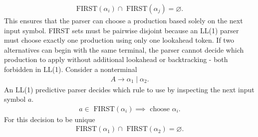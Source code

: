 \documentclass{report}
\begin{document}
\begin{itemize}
\begin{enumerate}
\begin{align*}
                        \text{FIRST}(\alpha_{i}) \cap \text{ FIRST}(\alpha_{j}) = \varnothing
                    .\end{align*}
                    This ensures that the parser can choose a production based solely on the next input symbol.
                    \bigbreak \noindent 
                    FIRST sets must be pairwise disjoint because an LL(1) parser must choose exactly one production using only one lookahead token. If two alternatives can begin with the same terminal, the parser cannot decide which production to apply without additional lookahead or backtracking - both forbidden in LL(1).
                    \bigbreak \noindent 
                    Consider a nonterminal 
                    \begin{align*}
                        A \to \alpha_{1} \mid \alpha_{2}
                    .\end{align*}
                    An LL(1) predictive parser decides which rule to use by inspecting the next input symbol $a$. 
                    \begin{align*}
                        a \in \text{ FIRST}(\alpha_{i}) \implies \text{ choose } \alpha_{i}
                    .\end{align*}
                    For this decision to be unique 
                    \begin{align*}
                        \text{FIRST}(\alpha_{1}) \cap \text{ FIRST}(\alpha_{2}) = \varnothing
                    .\end{align*}



\end{enumerate}
\end{itemize}
\end{document}
